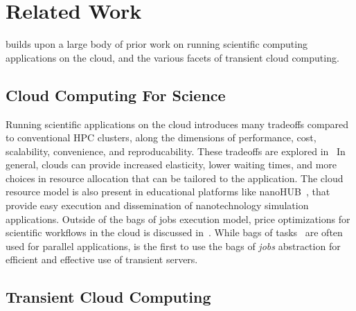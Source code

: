 \vspace*{\subsecspace}
\section{Related Work}
\label{sec:related}


\sysname builds upon a large body of prior work on running scientific computing applications on the cloud, and the various facets of transient cloud computing.  

\vspace*{\subsecspace}
\subsection{Cloud Computing For Science}

Running scientific applications on the cloud introduces many tradeoffs compared to conventional HPC clusters, along the dimensions of performance, cost, scalability, convenience, and reproducability.
These tradeoffs are explored in~\cite{iosup_performance_2011, zhai_cloud_2011, marathe2013comparative, galante_analysis_2016, benedictis_cloud-aware_2014, buyya-hpc-survey}
In general, clouds can provide increased elasticity, lower waiting times, and more choices in resource allocation that can be tailored to the application.
The cloud resource model is also present in educational platforms like nanoHUB~\cite{nanohub}, that provide easy execution and dissemination of nanotechnology simulation applications.
Outside of the bags of jobs execution model, price optimizations for scientific workflows in the cloud is discussed in~\cite{gari_learning_2019}. 
While bags of tasks~\cite{varshney_autobot_2019} are often used for parallel applications, \sysname is the first to use the bags of \emph{jobs} abstraction for efficient and effective use of transient servers. 

\vspace*{\subsecspace}
\subsection{Transient Cloud Computing}

